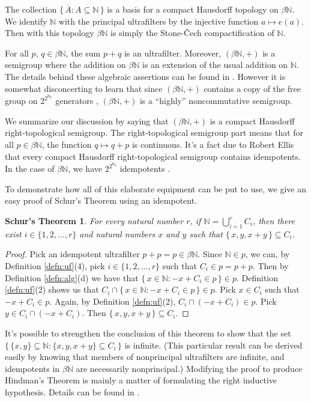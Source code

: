 \documentclass[12pt]{article}
\theoremstyle{plain}
\newtheorem{schur}[thm]{Schur's Theorem}
\theoremstyle{definition}
\newcommand{\bbN}{\mathbb{N}}
\begin{document}
The collection $\{\, \overline{A} : A \subseteq \bbN \,\}$ is a
basis for a compact Hausdorff topology on $\beta\bbN$.
We identify $\bbN$ with the principal ultrafilters by the injective
function $a \mapsto e(a)$. 
Then with this topology $\beta\bbN$ is simply the Stone-\v{C}ech
compactification of $\bbN$. 

For all $p$, $q \in \beta\bbN$, the sum $p+q$ is an ultrafilter.
Moreover, $(\beta\bbN, +)$ is a semigroup where the addition on
$\beta\bbN$ is an extension of the usual addition on $\bbN$. 
The details behind these algebraic assertions can be found in
\cite[Chapter 4 Section 1]{Hindman:1998fk}.
However it is somewhat disconcerting to learn that since $(\beta\bbN,
+)$ contains a copy of the free group on $2^{2^{\aleph_0}}$ generators
\cite[Corollary 7.36]{Hindman:1998fk}, $(\beta\bbN,+)$ is a ``highly''
noncommutative semigroup.


We summarize our discussion by saying that $(\beta\bbN,
+)$ is a compact Hausdorff right-topological semigroup. 
The right-topological semigroup part means that for all $p \in
\beta\bbN$, the function $q \mapsto q+p$ is continuous.
It's a fact due to Robert Ellis \cite[Corollary 2.10]{Ellis:1969zr}
that every compact Hausdorff right-topological semigroup contains
idempotents. 
In the case of $\beta\bbN$, we have 
$2^{2^{\aleph_0}}$ idempotents \cite[Theorem 6.44]{Hindman:1998fk}. 

To demonstrate how all of this elaborate equipment can be put to use,
we give an easy proof of Schur's Theorem using an idempotent.

\begin{schur}
  For every natural number $r$, if  \/ $\bbN = \bigcup_{i=1}^r C_i$,
  then there exist $i \in \{1, 2, \ldots, r\}$ and natural numbers
  $x$ and $y$ such that $\{\, x, y, x+y \,\} \subseteq C_i$.
\end{schur}
\begin{proof}
  Pick an idempotent ultrafilter $p + p = p \in \beta\bbN$. 
  Since $\bbN \in p$, we can, by Definition \ref{defn:uf}(4),
  pick $i \in \{1, 2, \ldots, r\}$ such that $C_i \in p
  = p + p$. 
  Then by Definition \ref{defn:alg}(d) we have that $\{\, x \in \bbN : -x
  + C_i \in p \,\} \in p$.
  Definition \ref{defn:uf}(2) shows us that $C_i \cap
  \{\, x\in \bbN : -x + C_i \in p \,\} \in p$.
  Pick $x \in C_i$ such that $-x+C_i \in p$.
  Again, by Definition \ref{defn:uf}(2), $C_i \cap (-x+C_i) \in p$.
  Pick $y \in C_i \cap (-x+C_i)$.
  Then $\{\, x, y, x+y\,\} \subseteq C_i$.
\end{proof}
It's possible to strengthen the conclusion of this theorem to show
that the set $\bigl\{\, \{x, y\} \subseteq \bbN : \{x, y, x+y\}
\subseteq C_i\,\bigr\}$ is infinite.
(This particular result can be derived easily by knowing that members
of nonprincipal ultrafilters are infinite, and idempotents in
$\beta\bbN$ are necessarily nonprincipal.)
Modifying the proof to produce Hindman's Theorem is mainly a matter of
formulating the right inductive hypothesis.
Details can be found in \cite[Theorem 5.8]{Hindman:1998fk}. 
\end{document}
